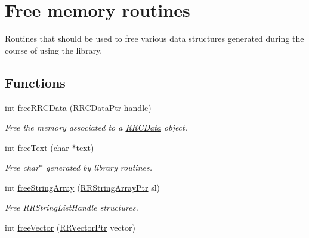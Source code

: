 \hypertarget{group__free_routines}{\section{Free memory routines}
\label{group__free_routines}
}


Routines that should be used to free various data structures generated during the course of using the library.  


\subsection*{Functions}
\begin{DoxyCompactItemize}
\item 
\hypertarget{group__free_routines_gaf088e47d2a725b40685364cd99a574f2}{int \hyperlink{group__free_routines_gaf088e47d2a725b40685364cd99a574f2}{free\+R\+R\+C\+Data} (\hyperlink{rrc__types_8h_a9da8b124eb9c3c0045f8926c6a420b4a}{R\+R\+C\+Data\+Ptr} handle)}\label{group__free_routines_gaf088e47d2a725b40685364cd99a574f2}

\begin{DoxyCompactList}\small\item\em Free the memory associated to a \hyperlink{struct_r_r_c_data}{R\+R\+C\+Data} object. \end{DoxyCompactList}\item 
\hypertarget{group__free_routines_ga17973fb866b2c1ed179d94eefa8fae10}{int \hyperlink{group__free_routines_ga17973fb866b2c1ed179d94eefa8fae10}{free\+Text} (char $\ast$text)}\label{group__free_routines_ga17973fb866b2c1ed179d94eefa8fae10}

\begin{DoxyCompactList}\small\item\em Free char$\ast$ generated by library routines. \end{DoxyCompactList}\item 
int \hyperlink{group__free_routines_gae19c27634564ab437193f40867eade5e}{free\+String\+Array} (\hyperlink{rrc__types_8h_a7c9475df6c7337d99482b13a365e7596}{R\+R\+String\+Array\+Ptr} sl)
\begin{DoxyCompactList}\small\item\em Free R\+R\+String\+List\+Handle structures. \end{DoxyCompactList}\item 
\hypertarget{group__free_routines_ga65e2a46b4e9fdd17f994542d18fb4649}{int \hyperlink{group__free_routines_ga65e2a46b4e9fdd17f994542d18fb4649}{free\+Vector} (\hyperlink{rrc__types_8h_a3be72d6006034fd349f753d2bf441bf7}{R\+R\+Vector\+Ptr} vector)}\label{group__free_routines_ga65e2a46b4e9fdd17f994542d18fb4649}


\end{DoxyCompactItemize}
